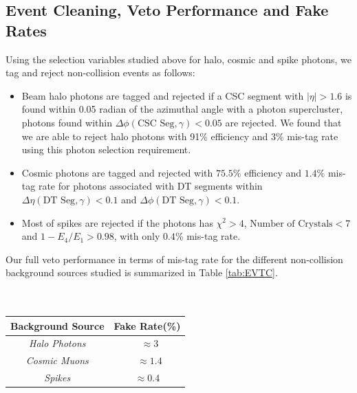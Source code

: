 \subsection{Event Cleaning, Veto Performance and Fake Rates}
Using the selection variables studied above for halo, cosmic and spike photons, we tag and reject non-collision events as follows: 
\begin{itemize}
\item Beam halo photons are tagged and rejected if a CSC segment with $|\eta| > 1.6$ is found within 0.05 radian of the azimuthal angle with a photon supercluster, \ie photons found within $\Delta\phi(\mbox{CSC Seg},\gamma) < 0.05$ are rejected. We found that we are able to reject halo photons with 91\% efficiency and 3\% mis-tag rate using this photon selection requirement.
\item Cosmic photons are tagged and rejected with $75.5$\% efficiency and $1.4$\% mis-tag rate for photons associated with DT segments within $\Delta\eta(\mbox{DT Seg},\gamma) < 0.1$ and $\Delta\phi(\mbox{DT Seg},\gamma) < 0.1$.
\item Most of spikes are rejected if the photons has $\chi^{2} > 4$, $\mbox{Number of Crystals} < 7$ and $ 1-E_{4}/E_{1} > 0.98$, with only $0.4$\% mis-tag rate.
\end{itemize}
Our full veto performance in terms of mis-tag rate for the different non-collision background sources studied  is summarized in Table \ref{tab:EVTC}.

\paragraph*{}\mbox{}\\
\begin{minipage}{\linewidth} 
\begin{center}
\begin{tabular}{|c| c|}
\hline
\bfseries{Background Source} & \bfseries {Fake Rate}(\%)\\
\hline\hline
\textit{Halo Photons} & ~$\approx 3$ \\
\textit{Cosmic Muons} & ~$\approx 1.4$ \\
\textit{Spikes} & $\approx 0.4$ \\
\hline
\end{tabular}
\label{tab:EVTC} 
\end{center}
\end{minipage}

